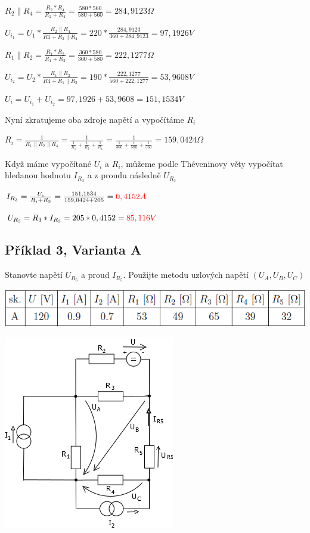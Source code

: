 \documentclass{article}
\begin{document}
\vspace{1pc}


\centerline{$R_2 \parallel R_4 = \frac{ R_2*R_4}{R_2+R_4} = \frac{580*560}{580+560} = 284,9123 \Omega$}
\centerline{$U_{i_1}= U_1 * \frac{R_2 \parallel R_4}{R1+R_2 \parallel R_4} = 220 * \frac{284,9123}{360+284,9123} = 97,1926 V$}
\centerline{$ R_1 \parallel R_2 = \frac{ R_1*R_2}{R_1+R_2} = \frac{360*580}{360+580} = 222,1277 \Omega$}
\centerline{$U_{i_2}= U_2 * \frac{R_1 \parallel R_2}{R4+R_1 \parallel R_2} = 190 * \frac{222,1277}{560+222,1277} = 53,9608 V$}
\centerline{$U_i = U_{i_1}+U_{i_2} = 97,1926+53,9608 = 151,1534V$}
\vspace{2pc}
\noindent Nyní zkratujeme oba zdroje napětí a vypočítáme $R_i$

\vspace{1pc}
\centerline{$R_i = \frac{1}{R_1 \parallel R_2 \parallel R_4} = \frac{1}{\frac{1}{R_1}+\frac{1}{R_2}+\frac{1}{R_4}} =  \frac{1}{\frac{1}{360}+\frac{1}{580}+\frac{1}{560}} = 159,0424\Omega$}
\vspace{2pc}
\noindent Když máme vypočítané $U_i$ a $R_i$, můžeme podle Théveninovy věty vypočítat hledanou hodnotu $I_{R_3}$ a z proudu následně $U_{R_3}$

\vspace{1pc}
\centerline{$I_{R_3} = \frac{U_i}{R_i+R_3} = \frac{151,1534}{159,0424+205} = \textcolor{red}{0,4152A}$}
\centerline{$U_{R_3} = R_3 * I_{R_3} = 205* 0,4152 = \textcolor{red}{85,116V}$}

\clearpage

\subsection{Příklad 3, Varianta A}
\centerline{Stanovte napětí $U_{R_5}$ a proud $I_{R_5}$. Použijte metodu uzlových napětí $(U_A,U_B,U_C)$}

\vspace{1pc}
\centerline{\includegraphics{hodnoty3}}
\vspace{2pc}
\centerline{\includegraphics{zadani3}}
\vspace{2pc}
\end{document}
